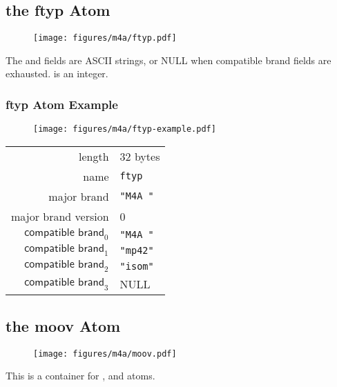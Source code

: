 \subsection{the ftyp Atom}
\begin{figure}[h]
  \texttt{[image: figures/m4a/ftyp.pdf]}
\end{figure}
\par
\noindent
The  and  fields are ASCII strings,
or NULL when compatible brand fields are exhausted.
 is an integer.

\subsubsection{ftyp Atom Example}
\begin{figure}[h]
  \texttt{[image: figures/m4a/ftyp-example.pdf]}
\end{figure}
\par
\noindent
\begin{tabular}{rl}
  \textsf{length} & 32 bytes \\
  \textsf{name} & \texttt{ftyp} \\
  \textsf{major brand} & \texttt{"M4A "} \\
  \textsf{major brand version} & 0 \\
  $\textsf{compatible brand}_0$ & \texttt{"M4A "} \\
  $\textsf{compatible brand}_1$ & \texttt{"mp42"} \\
  $\textsf{compatible brand}_2$ & \texttt{"isom"} \\
  $\textsf{compatible brand}_3$ & NULL \\
\end{tabular}

\clearpage

\subsection{the moov Atom}
\begin{figure}[h]
  \texttt{[image: figures/m4a/moov.pdf]}
\end{figure}
\par
\noindent
This is a container for \hyperref[atom:mvhd]{},
\hyperref[atom:trak]{} and
\hyperref[atom:udta]{} atoms.

\clearpage

